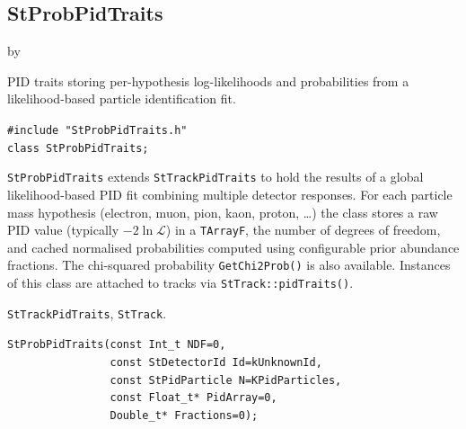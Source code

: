 \documentclass[twoside]{article}
\newcommand{\entrylabel}[1]{\mbox{\textbf{{#1}}}\hfil}%
\newenvironment{entry}
{\begin{list}{}%
    {\renewcommand{\makelabel}{\entrylabel}%
     \setlength{\labelwidth}{90pt}%
     \setlength{\leftmargin}{\labelwidth}
     \advance\leftmargin by \labelsep%
      }%
    }%
  {\end{list}}
\newcommand{\Entrylabel}[1]%
{\raisebox{0pt}[1ex][0pt]{\makebox[\labelwidth][l]%
    {\parbox[t]{\labelwidth}{\hspace{0pt}\textbf{{#1}}}}}}
\newenvironment{Entry}%
{\renewcommand{\entrylabel}{\Entrylabel}\begin{entry}}%
  {\end{entry}}
\begin{document}
\subsection{StProbPidTraits}
\label{sec:StProbPidTraits}
\begin{Entry}
\item[Summary]
    PID traits storing per-hypothesis log-likelihoods and probabilities from a
    likelihood-based particle identification fit.

\item[Synopsis]
    \verb+#include "StProbPidTraits.h"+\\
    \verb+class StProbPidTraits;+\\

\item[Description]
    \texttt{StProbPidTraits} extends \texttt{StTrackPidTraits} to hold the
    results of a global likelihood-based PID fit combining multiple detector
    responses.  For each particle mass hypothesis (electron, muon, pion, kaon,
    proton, \ldots) the class stores a raw PID value (typically
    $-2\ln\mathcal{L}$) in a \texttt{TArrayF}, the number of degrees of
    freedom, and cached normalised probabilities computed using configurable
    prior abundance fractions.  The chi-squared probability
    \texttt{GetChi2Prob()} is also available.  Instances of this class are
    attached to tracks via \texttt{StTrack::pidTraits()}.

\item[Related Classes]
    \texttt{StTrackPidTraits}, \texttt{StTrack}.

\item[Public\\ Constructors]
    \verb+StProbPidTraits(const Int_t NDF=0,+\\
    \verb+                const StDetectorId Id=kUnknownId,+\\
    \verb+                const StPidParticle N=KPidParticles,+\\
    \verb+                const Float_t* PidArray=0,+\\
    \verb+                Double_t* Fractions=0);+\\


\end{Entry}
\end{document}
